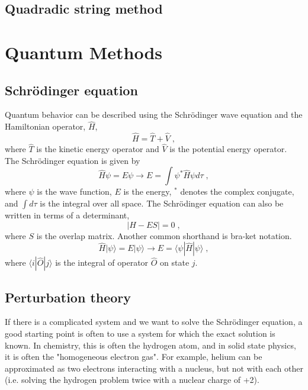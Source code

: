 \documentclass[12pt]{report}
\begin{document}
\subsection{Quadradic string method}



\section{Quantum Methods}

\subsection{Schr\"{o}dinger equation}

Quantum behavior can be described using the Schr\"{o}dinger wave equation and
the Hamiltonian operator, $\hat H$,
\begin{equation}
 \hat H = \hat T + \hat V \; ,
\end{equation}
where $\hat T$ is the kinetic energy operator and $\hat V$ is the potential
energy operator. The Schr\"{o}dinger equation is given by
\begin{equation}
 \hat H\psi = E\psi \to E = \int \psi^*\hat H\psi d\tau \; ,
\end{equation}
where $\psi$ is the wave function, $E$ is the energy, $^*$ denotes the complex
conjugate, and $\int d\tau$ is the integral over all space. The
Schr\"{o}dinger equation can also be written in terms of a determinant,
\begin{equation}
 |H-ES| = 0 \; ,
\end{equation}
where $S$ is the overlap matrix. Another common shorthand is bra-ket notation.
\begin{equation}
 \hat H|\psi\rangle = E|\psi\rangle \to E=\langle\psi|\hat H|\psi\rangle \; ,
\end{equation}
where $\langle i|\hat O|j\rangle$ is the integral of operator $\hat O$ on
state $j$.

\subsection{Perturbation theory}

If there is a complicated system and we want to solve the Schr\"{o}dinger 
equation, a good starting point is often to use a system for which the exact
solution is known. In chemistry, this is often the hydrogen atom, and in solid
state physics, it is often the "homogeneous electron gas". For example, helium
can be approximated as two electrons interacting with a nucleus, but not with
each other (i.e. solving the hydrogen problem twice with a nuclear charge of
+2). \\
\end{document}
